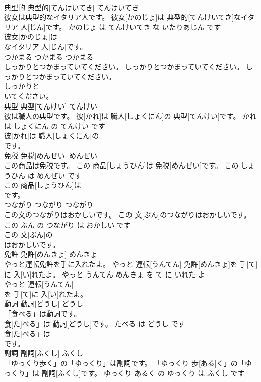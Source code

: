 \documentclass[8pt]{extreport}
\begin{document}
\begin{CJK}{UTF8}{min}
\\	典型的	典型的[てんけいてき]	てんけいてき	
\\	彼女は典型的なイタリア人です。	彼女[かのじょ]は 典型的[てんけいてき]なイタリア 人[じん]です。	かのじょ は てんけいてき な いたりあじん です	
\\	彼女[かのじょ]は
\\	なイタリア 人[じん]です。			
\\	つかまる	つかまる	つかまる	
\\	しっかりとつかまっていてください。	しっかりとつかまっていてください。	しっかりとつかまっていてください。	
\\	しっかりと
\\	いてください。			
\\	典型	典型[てんけい]	てんけい	
\\	彼は職人の典型です。	彼[かれ]は 職人[しょくにん]の 典型[てんけい]です。	かれ は しょくにん の てんけい です	
\\	彼[かれ]は 職人[しょくにん]の
\\	です。			
\\	免税	免税[めんぜい]	めんぜい	
\\	この商品は免税です。	この 商品[しょうひん]は 免税[めんぜい]です。	この しょうひん は めんぜい です	
\\	この 商品[しょうひん]は
\\	です。			
\\	つながり	つながり	つながり	
\\	この文のつながりはおかしいです。	この 文[ぶん]のつながりはおかしいです。	この ぶん の つながり は おかしい です	
\\	この 文[ぶん]の
\\	はおかしいです。			
\\	免許	免許[めんきょ]	めんきょ	
\\	やっと運転免許を手に入れたよ。	やっと 運転[うんてん] 免許[めんきょ]を 手[て]に 入[い]れたよ。	やっと うんてん めんきょ を て に いれた よ	
\\	やっと 運転[うんてん]
\\	を 手[て]に 入[い]れたよ。			
\\	動詞	動詞[どうし]	どうし	
\\	「食べる」は動詞です。	
\\	食[た]べる」は 動詞[どうし]です。	たべる は どうし です	
\\	食[た]べる」は
\\	です。			
\\	副詞	副詞[ふくし]	ふくし	
\\	「ゆっくり歩く」の「ゆっくり」は副詞です。	「ゆっくり 歩[ある]く」の「ゆっくり」は 副詞[ふくし]です。	ゆっくり あるく の ゆっくり は ふくし です	

\end{CJK}
\end{document}
